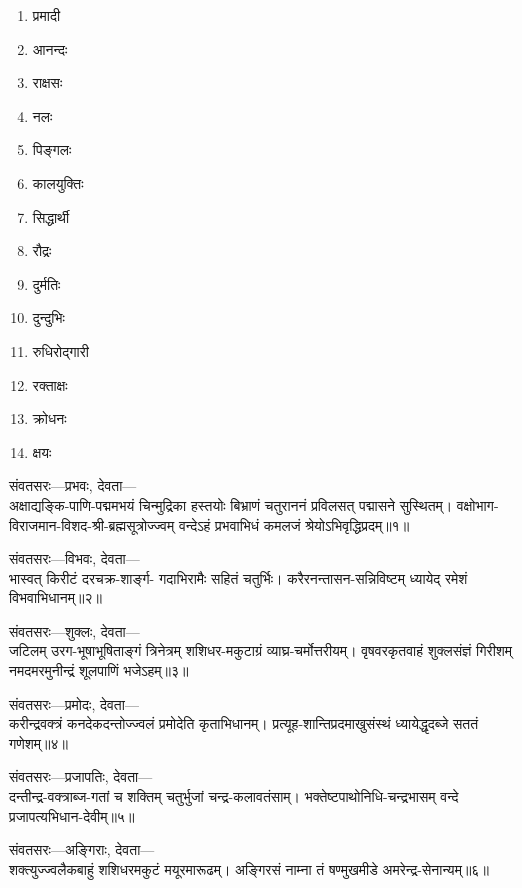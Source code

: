 \begin{multicols}{2}
\begin{enumerate}
\item प्रमादी 
\item आनन्दः 
\item राक्षसः 
\item नलः 
\item पिङ्गलः 
\item कालयुक्तिः 
\item सिद्धार्थी 
\item रौद्रः 
\item दुर्मतिः 
\item दुन्दुभिः 
\item रुधिरोद्गारी 
\item रक्ताक्षः 
\item क्रोधनः 
\item क्षयः
\end{enumerate}
\end{multicols}


संवतसरः---प्रभवः, देवता---\\

अक्षाद्यङ्कि-पाणि-पद्ममभयं चिन्मुद्रिका हस्तयोः
बिभ्राणं चतुराननं प्रविलसत् पद्मासने सुस्थितम्।
वक्षोभाग-विराजमान-विशद-श्री-ब्रह्मसूत्रोज्ज्वम्
वन्देऽहं प्रभवाभिधं कमलजं श्रेयोऽभिवृद्धिप्रदम्॥१॥

संवतसरः---विभवः, देवता---\\

भास्वत् किरीटं दरचक्र-शार्ङ्ग-
गदाभिरामैः सहितं चतुर्भिः।
करैरनन्तासन-सन्निविष्टम्
ध्यायेद् रमेशं विभवाभिधानम्॥२॥

संवतसरः---शुक्लः, देवता---\\

जटिलम् उरग-भूषाभूषिताङ्गं त्रिनेत्रम्
शशिधर-मकुटाग्रं व्याघ्र-चर्मोत्तरीयम्।
वृषवरकृतवाहं शुक्लसंज्ञं गिरीशम्
नमदमरमुनीन्द्रं शूलपाणिं भजेऽहम्॥३॥

संवतसरः---प्रमोदः, देवता---\\

करीन्द्रवक्त्रं कनदेकदन्तोज्ज्वलं प्रमोदेति कृताभिधानम्।
प्रत्यूह-शान्तिप्रदमाखुसंस्थं ध्यायेद्धृदब्जे सततं गणेशम्॥४॥

संवतसरः---प्रजापतिः, देवता---\\

दन्तीन्द्र-वक्त्राब्ज-गतां च शक्तिम्
चतुर्भुजां चन्द्र-कलावतंसाम्।
भक्तेष्टपाथोनिधि-चन्द्रभासम्
वन्दे प्रजापत्यभिधान-देवीम्॥५॥

संवतसरः---अङ्गिराः, देवता---\\

शक्त्युज्ज्वलैकबाहुं शशिधरमकुटं मयूरमारूढम्।
अङ्गिरसं नाम्ना तं षण्मुखमीडे अमरेन्द्र-सेनान्यम्॥६॥

